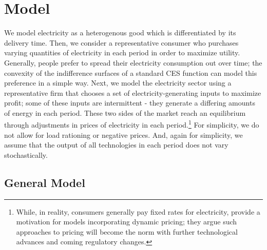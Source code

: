 \documentclass[11pt,a4paper]{extarticle}
\begin{document}

\section{Model}

We model electricity as a heterogenous good which is differentiated by its delivery time. Then, we consider a representative consumer who purchases varying quantities of electricity in each period in order to maximize utility. Generally, people prefer to spread their electricity consumption out over time; the convexity of the indifference surfaces of a standard CES function can model this preference in a simple way. Next, we model the electricity sector using a representative firm that chooses a set of electricity-generating inputs to maximize profit; some of these inputs are intermittent - they generate a differing amounts of energy in each period. These two sides of the market reach an equilibrium through adjustments in prices of electricity in each period.\footnote{While, in reality, consumers generally pay fixed rates for electricity, \citeauthor{HH} provide a motivation for models incorporating dynamic pricing; they argue such approaches to pricing will become the norm with further technological advances and coming regulatory changes. } For simplicity, we do not allow for load rationing  or negative prices. And, again for simplicity, we assume that the output of all technologies in each period does not vary stochastically. 

\subsection{General Model}
\end{document}
